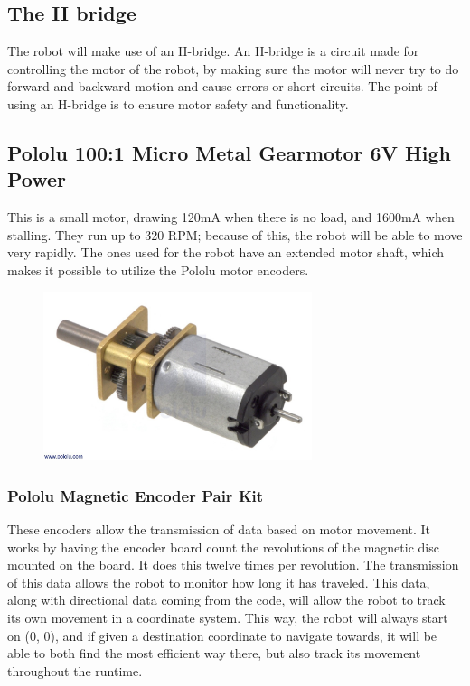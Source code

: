 \subsection{The H bridge}
The robot will make use of an H-bridge. An H-bridge is a circuit made for controlling the motor of the robot, by making sure the motor will never try to do forward and backward motion  and cause errors or short circuits. The point of using an H-bridge is to ensure motor safety and functionality.

\subsection{Pololu 100:1 Micro Metal Gearmotor 6V High Power}

This is a small motor, drawing 120mA when there is no load, and 1600mA when stalling. They run up to 320 RPM; because of this, the robot will be able to move very rapidly. The ones used for the robot have an extended motor shaft, which makes it possible to utilize the Pololu motor encoders.

\begin{figure}[!ht]
	\centering
	\includegraphics[width=0.7\textwidth]{figures/pololu.jpg}
	\caption{}
	\label{Hardware diagram}
\end{figure}

\subsubsection{Pololu Magnetic Encoder Pair Kit}

These encoders allow the transmission of data based on motor movement. It works by having the encoder board count the revolutions of the magnetic disc mounted on the board. It does this twelve times per revolution. The transmission of this data allows the robot to monitor how long it has traveled. This data, along with directional data coming from the code, will allow the robot to track its own movement in a coordinate system. This way, the robot will always start on (0, 0), and if given a destination coordinate to navigate towards, it will be able to both find the most efficient way there, but also track its movement throughout the runtime.

